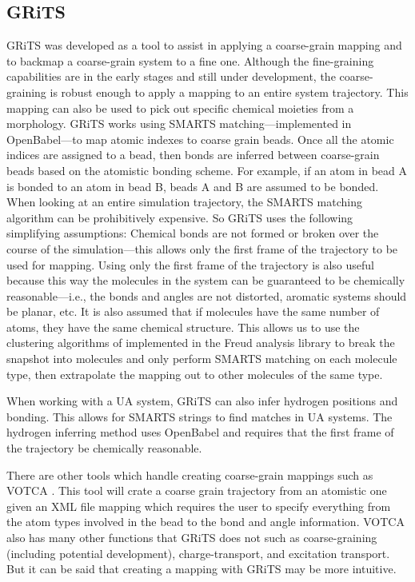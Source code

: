\subsection{GRiTS}
GRiTS was developed as a tool to assist in applying a coarse-grain mapping and to backmap a coarse-grain system to a fine one. 
Although the fine-graining capabilities are in the early stages and still under development, the coarse-graining is robust enough to apply a mapping to an entire system trajectory. 
This mapping can also be used to pick out specific chemical moieties from a morphology. 
GRiTS works using SMARTS matching---implemented in OpenBabel---to map atomic indexes to coarse grain beads. 
Once all the atomic indices are assigned to a bead, then bonds are inferred between coarse-grain beads based on the atomistic bonding scheme. 
For example, if an atom in bead A is bonded to an atom in bead B, beads A and B are assumed to be bonded. 
When looking at an entire simulation trajectory, the SMARTS matching algorithm can be prohibitively expensive.
So GRiTS uses the following simplifying assumptions: Chemical bonds are not formed or broken over the course of the simulation---this allows only the first frame of the trajectory to be used for mapping. 
Using only the first frame of the trajectory is also useful because this way the molecules in the system can be guaranteed to be chemically reasonable---i.e., the bonds and angles are not distorted, aromatic systems should be planar, etc. 
It is also assumed that if molecules have the same number of atoms, they have the same chemical structure. 
This allows us to use the clustering algorithms of implemented in the Freud analysis library to break the snapshot into molecules and only perform SMARTS matching on each molecule type, then extrapolate the mapping out to other molecules of the same type.

When working with a UA system, GRiTS can also infer hydrogen positions and bonding. This allows for SMARTS strings to find matches in UA systems. The hydrogen inferring method uses OpenBabel and requires that the first frame of the trajectory be chemically reasonable.

There are other tools which handle creating coarse-grain mappings such as VOTCA \citep{Ruhle2009}. 
This tool will crate a coarse grain trajectory from an atomistic one given an XML file mapping which requires the user to specify everything from the atom types involved in the bead to the bond and angle information.
VOTCA also has many other functions that GRiTS does not such as coarse-graining (including potential development), charge-transport, and excitation transport.
But it can be said that creating a mapping with GRiTS may be more intuitive.

